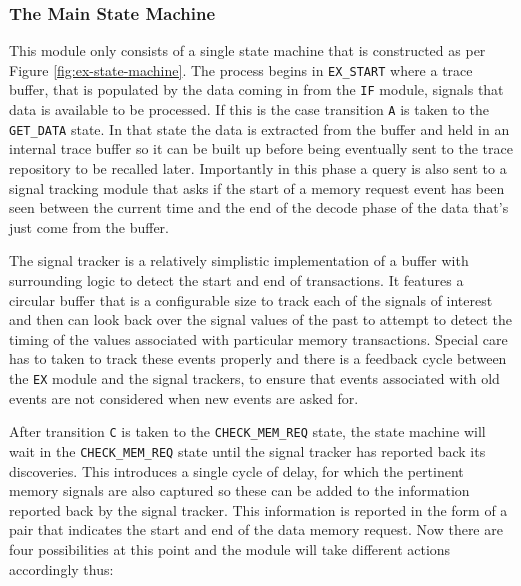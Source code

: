 \begin{sidewaysfigure}[htbp]
	
	\caption{The central state machine that controls the operation of the \texttt{EX} module. This works asynchronously with the processor, operating in a producer/consumer model with the \texttt{IF} module that works synchronously with the processor.}
	\label{fig:ex-state-machine}
\end{sidewaysfigure} 

\subsubsection{The Main State Machine}

This module only consists of a single state machine that is constructed as per Figure \ref{fig:ex-state-machine}. The process begins in \texttt{EX\_START} where a trace buffer, that is populated by the data coming in from the \texttt{IF} module, signals that data is available to be processed. If this is the case transition \texttt{A} is taken to the \texttt{GET\_DATA} state. In that state the data is extracted from the buffer and held in an internal trace buffer so it can be built up before being eventually sent to the trace repository to be recalled later. Importantly in this phase a query is also sent to a signal tracking module that asks if the start of a memory request event has been seen between the current time and the end of the decode phase of the data that's just come from the buffer. 

The signal tracker is a relatively simplistic implementation of a buffer with surrounding logic to detect the start and end of transactions. It features a circular buffer that is a configurable size to track each of the signals of interest and then can look back over the signal values of the past to attempt to detect the timing of the values associated with particular memory transactions. Special care has to taken to track these events properly and there is a feedback cycle between the \texttt{EX} module and the signal trackers, to ensure that events associated with old events are not considered when new events are asked for.

After transition \texttt{C} is taken to the \texttt{CHECK\_MEM\_REQ} state, the state machine will wait in the \texttt{CHECK\_MEM\_REQ} state until the signal tracker has reported back its discoveries. This introduces a single cycle of delay, for which the pertinent memory signals are also captured so these can be added to the information reported back by the signal tracker. This information is reported in the form of a pair that indicates the start and end of the data memory request. Now there are four possibilities at this point and the module will take different actions accordingly thus:

